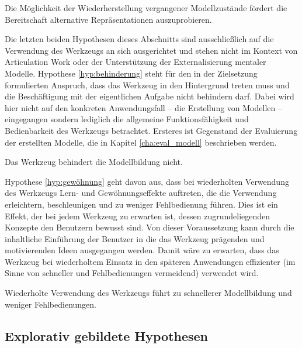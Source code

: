 \begin{hyp}
	\label{hyp:wiederherstellung}
	Die Möglichkeit der Wiederherstellung vergangener Modellzustände fördert die Bereitschaft alternative Repräsentationen auszuprobieren.
\end{hyp}

Die letzten beiden Hypothesen dieses Abschnitts sind ausschließlich auf die Verwendung des Werkzeugs an sich ausgerichtet und stehen nicht im Kontext von Articulation Work oder der Unterstützung der Externalisierung mentaler Modelle. Hypothese \ref{hyp:behinderung} steht für den in der Zielsetzung formulierten Anspruch, dass das Werkzeug in den Hintergrund treten muss und die Beschäftigung mit der eigentlichen Aufgabe nicht behindern darf. Dabei wird hier nicht auf den konkreten Anwendungsfall -- die Erstellung von Modellen -- eingegangen sondern lediglich die allgemeine Funktionsfähigkeit und Bedienbarkeit des Werkzeugs betrachtet. Ersteres ist Gegenstand der Evaluierung der erstellten Modelle, die in Kapitel \ref{cha:eval_modell} beschrieben werden.

\begin{hyp}
	\label{hyp:behinderung}
	Das Werkzeug behindert die Modellbildung nicht.
\end{hyp}

Hypothese \ref{hyp:gewöhnung} geht davon aus, dass bei wiederholten Verwendung des Werkzeugs Lern- und Gewöhnungseffekte auftreten, die die Verwendung erleichtern, beschleunigen und zu weniger Fehlbedienung führen. Dies ist ein Effekt, der bei jedem Werkzeug zu erwarten ist, dessen zugrundeliegenden Konzepte den Benutzern bewusst sind. Von dieser Voraussetzung kann durch die inhaltliche Einführung der Benutzer in die das Werkzeug prägenden und motivierenden Ideen ausgegangen werden. Damit wäre zu erwarten, dass das Werkzeug bei wiederholtem Einsatz in den späteren Anwendungen effizienter (im Sinne von schneller und Fehlbedienungen vermeidend) verwendet wird.

\begin{hyp}
	\label{hyp:gewöhnung}
	Wiederholte Verwendung des Werkzeugs führt zu schnellerer Modellbildung und weniger Fehlbedienungen.
\end{hyp}


\subsection{Explorativ gebildete Hypothesen} %
\label{sub:explorativ_gebildete_hypothesen}

